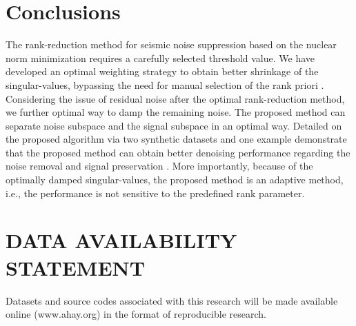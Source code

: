 \section{Conclusions}
The rank-reduction method for seismic noise suppression based on the nuclear norm minimization requires a carefully selected threshold value. We have developed an optimal weighting strategy to obtain better shrinkage of the singular-values, bypassing the need for manual selection of the rank  priori . Considering the issue of residual noise after the optimal rank-reduction method, we further  optimal way to damp the remaining noise. The proposed method can separate  noise subspace and the signal subspace in an optimal way. Detailed  on the proposed algorithm via two synthetic datasets and one  example demonstrate that the proposed method can obtain better denoising performance regarding the noise removal and signal preservation . More importantly, because of the optimally damped singular-values, the proposed method is an adaptive method, i.e., the performance is not sensitive to the predefined rank parameter.

\section{DATA AVAILABILITY STATEMENT}
Datasets and source codes associated with this research will be made available online (www.ahay.org) in the format of reproducible research.














